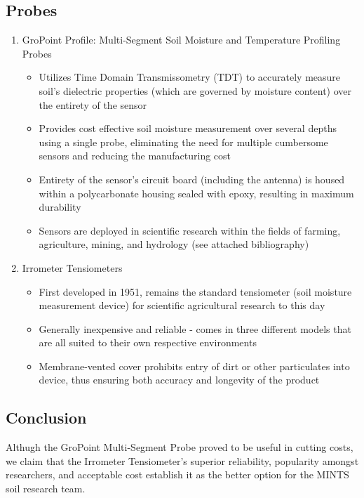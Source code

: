 \documentclass{article}
\begin{document}
\subsection{Probes}
\begin{enumerate}
\item GroPoint Profile: Multi-Segment Soil Moisture and Temperature Profiling Probes
\begin{itemize}
    \item Utilizes Time Domain Transmissometry (TDT) to accurately measure soil's dielectric properties (which are governed by moisture content) over the entirety of the sensor 
    \item Provides cost effective soil moisture measurement over several depths using a single probe, eliminating the need for multiple cumbersome sensors and reducing the manufacturing cost
    \item Entirety of the sensor's circuit board (including the antenna) is housed within a polycarbonate housing sealed with epoxy, resulting in maximum durability
    \item Sensors are deployed in scientific research within the fields of farming, agriculture, mining, and hydrology (see attached bibliography)
\end{itemize}

\item Irrometer Tensiometers
\begin{itemize}
    \item First developed in 1951, remains the standard tensiometer (soil moisture measurement device) for scientific agricultural research to this day
    \item Generally inexpensive and reliable - comes in three different models that are all suited to their own respective environments
    \item Membrane-vented cover prohibits entry of dirt or other particulates into device, thus ensuring both accuracy and longevity of the product
\end{itemize}

\end{enumerate}

\subsection{Conclusion}
Althugh the GroPoint Multi-Segment Probe proved to be useful in cutting costs, we claim that the Irrometer Tensiometer's superior reliability, popularity amongst researchers, and acceptable cost establish it as the better option for the MINTS soil research team.
\end{document}
